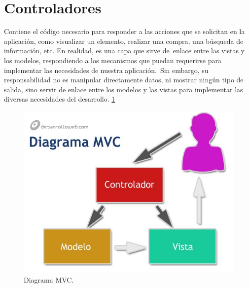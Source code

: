 \section{Controladores}
Contiene el código necesario para responder a las acciones que se solicitan en la aplicación, como visualizar un elemento, realizar una compra, una búsqueda de información, etc.
En realidad, es una capa que sirve de enlace entre las vistas y los modelos, respondiendo a los mecanismos que puedan requerirse para implementar las necesidades de nuestra aplicación. Sin embargo, su responsabilidad no es manipular directamente datos, ni mostrar ningún tipo de salida, sino servir de enlace entre los modelos y las vistas para implementar las diversas necesidades del desarrollo. \cite{marco3} \ref{figura8}
\begin{figure}[h]
  \label{figura8}
  \centering
  \includegraphics[scale=.35]{lib/assets/8}
  \caption{Diagrama MVC.}
\end{figure}


